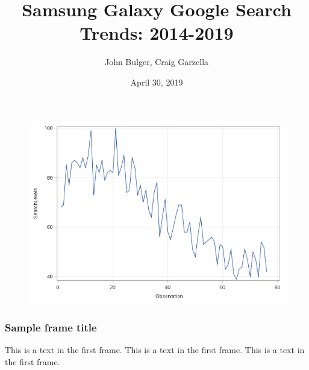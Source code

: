 \documentclass{beamer}
\title{Samsung Galaxy Google  Search Trends: 2014-2019}
\author{John Bulger, Craig Garzella}
\institute{Valparaiso Universiy}
\date{April 30, 2019}
\begin{document}
	
	\begin{figure}
		\includegraphics[scale=1]{All_Plot.PNG}
	\end{figure}
	
	\frame{\titlepage}
	
	\begin{frame}
	\frametitle{Sample frame title}
	This is a text in the first frame. This is a text in the first frame. This is a text in the first frame.
\end{frame}
\end{document}
